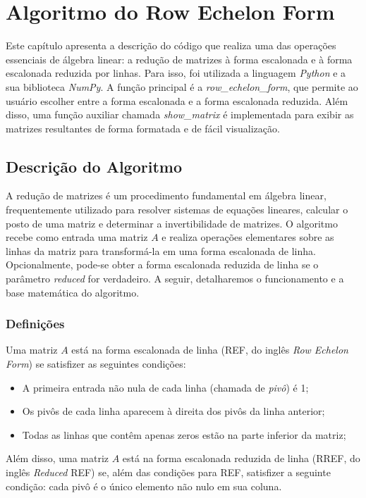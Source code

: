 \chapter{Algoritmo do Row Echelon Form}

Este capítulo apresenta a descrição do código que realiza uma das operações essenciais de álgebra linear: a redução de matrizes à forma escalonada e à forma escalonada reduzida por linhas. Para isso, foi utilizada a linguagem {\it Python} e a sua biblioteca {\it NumPy}. A função principal é a \textit{row\_echelon\_form}, que permite ao usuário escolher entre a forma escalonada e a forma escalonada reduzida. Além disso, uma função auxiliar chamada {\it show\_matrix} é implementada para exibir as matrizes resultantes de forma formatada e de fácil visualização.

\section{Descrição do Algoritmo}

A redução de matrizes é um procedimento fundamental em álgebra linear, frequentemente utilizado para resolver sistemas de equações lineares, calcular o posto de uma matriz e determinar a invertibilidade de matrizes. O algoritmo recebe como entrada uma matriz \( A \) e realiza operações elementares sobre as linhas da matriz para transformá-la em uma forma escalonada de linha. Opcionalmente, pode-se obter a forma escalonada reduzida de linha se o parâmetro \textit{reduced} for verdadeiro. A seguir, detalharemos o funcionamento e a base matemática do algoritmo.

\subsection{Definições}
Uma matriz \( A \) está na forma escalonada de linha (REF, do inglês {\it Row Echelon Form}) se satisfizer as seguintes condições:
\begin{itemize}
    \item A primeira entrada não nula de cada linha (chamada de \textit{pivô}) é 1;
    \item Os pivôs de cada linha aparecem à direita dos pivôs da linha anterior;
    \item Todas as linhas que contêm apenas zeros estão na parte inferior da matriz;
\end{itemize}

Além disso, uma matriz \( A \) está na forma escalonada reduzida de linha (RREF, do inglês {\it Reduced} REF) se, além das condições para REF, satisfizer a seguinte condição: cada pivô é o único elemento não nulo em sua coluna.

